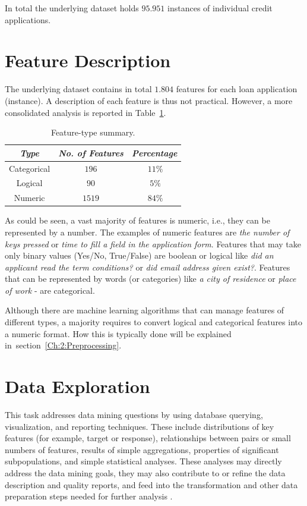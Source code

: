 In total the underlying dataset holds \(95.951\) instances of individual credit applications.

\section{Feature Description}\label{Ch:2:FeatureDesc}
The underlying dataset contains in total \(1.804\) features for each loan application (instance). A description of each feature is thus not practical. However, a more consolidated analysis is reported in Table~\ref{tab:feature-summary}. 

\begin{table}[h!]
  \begin{center}
    \caption{Feature-type summary.}
    \label{tab:feature-summary}
    \begin{tabular}{|c|c|c|}\hline
    \textit{Type} & \textit{No. of Features} & \textit{Percentage} \\
      \hline
     Categorical & \(196\) & \(~11\%\) \\ 
     \hline
     Logical & \(90\) &  \(~5\%\) \\
     \hline
     Numeric & \(1519\) &  \(~84\%\) \\
     \hline
    \end{tabular}
  \end{center}
\end{table}

As could be seen, a vast majority of features is numeric, i.e., they can be represented by a number. The examples of numeric features are \textit{the number of keys pressed} or \textit{time to fill a field in the application form}. Features that may take only binary values (Yes/No, True/False) are boolean or logical like \textit{did an applicant read the term conditions?} or \textit{did email address given exist?}. Features that can be represented by words (or categories) like \textit{a city of residence} or \textit{place of work} - are categorical.

Although there are machine learning algorithms that can manage features of different types, a majority requires to convert logical and categorical features into a numeric format. How this is typically done will be explained in~section~\ref{Ch:2:Preprocessing}.

\section{Data Exploration}\label{Ch:2:Exploration}
This task addresses data mining questions by using database querying, visualization, and reporting techniques. These include distributions of key features (for example, target or response), relationships between pairs or small numbers of features, results of simple aggregations, properties of significant subpopulations, and simple statistical analyses. These analyses may directly address the data mining goals, they may also contribute to or refine the data description and quality reports, and feed into the transformation and other data preparation steps needed for further analysis \cite{crisp}.

